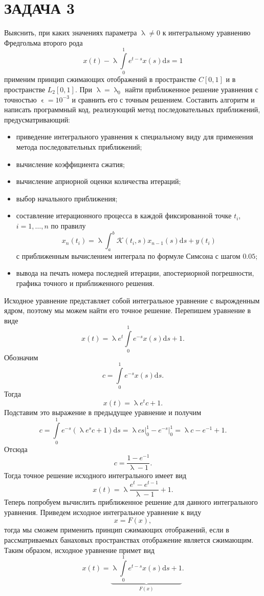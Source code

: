 \documentclass[a4paper, 12pt]{report}
\renewcommand{\lambda}{\uplambda}
\renewcommand{\epsilon}{\upvarepsilon}
\begin{document}
		\section*{ЗАДАЧА 3}
		Выяснить, при каких значениях параметра $\lambda \ne 0$ к интегральному уравнению Фредгольма второго рода
		$$
		x(t) - \lambda\int\limits_0^1e^{t-s} x(s)\mathrm{d} s = 1
		$$
		применим принцип сжимающих отображений в пространстве $C[0,1]$ и в пространстве $L_2[0,1]$. При $\lambda = \lambda_0$ найти приближенное решение уравнения с точностью $\epsilon = 10^{-3}$ и сравнить его с точным решением. Составить алгоритм и написать программный код, реализующий метод последовательных приближений, предусматривающий:
		\begin{itemize}
			\item приведение интегрального уравнения к специальному виду для применения метода последовательных приближений;
			\item вычисление коэффициента сжатия;
			\item вычисление априорной оценки количества итераций;
			\item выбор начального приближения;
			\item составление итерационного процесса в каждой фиксированной точке $t_i$, $i=1,\ldots, n$ по правилу $$x_{n}\left(t_{i}\right)=\lambda \int_{a}^{b} \mathcal{K}\left(t_{i}, s\right) x_{n-1}\left(s\right) \mathrm{d} s+y\left(t_{i}\right)$$
			с приближенным вычислением интеграла по формуле Симсона с шагом $0.05$;
			\item вывода на печать номера последней итерации, апостериорной погрешности, графика точного и приближенного решения.
		\end{itemize}
		Исходное уравнение представляет собой интегральное уравнение с вырожденным ядром, поэтому мы можем найти его точное решение. Перепишем уравнение в виде $$x(t) =\lambda e^t\int\limits_0^1e^{-s} x(s)\mathrm{d} s +1.$$
		Обозначим $$c = \int\limits_0^1e^{-s} x(s)\mathrm{d} s. $$
		Тогда $$x(t) = \lambda e^t c + 1.$$
		Подставим это выражение в предыдущее уравнение и получим $$c = \int\limits_0^1e^{-s}(\lambda e^s c + 1)\mathrm{d} s = \lambda c s\Big|_0^1 - e^{-s}\Big|_0^1 = \lambda c - e^{-1} + 1.$$
		Отсюда $$c = \dfrac{1 - e^{-1}}{\lambda - 1}.$$
		Тогда точное решение исходного интегрального имеет вид $$x(t) = \lambda \dfrac{e^t - e^{t-1}}{\lambda - 1} + 1.$$
		Теперь попробуем вычислить приближенное решение для данного интегрального уравнения.
		Приведем исходное интегральное уравнение к виду $$x = F(x),$$ тогда мы сможем применить принцип сжимающих отображений, если в рассматриваемых банаховых пространствах отображение является сжимающим. Таким образом, исходное уравнение примет вид $$x(t) =\underbrace{ \lambda\int\limits_0^1e^{t-s} x(s)\mathrm{d} s +1}_{F(x)}.$$
\end{document}

